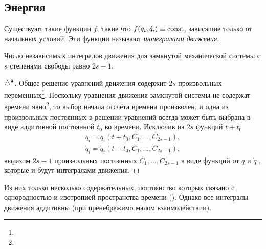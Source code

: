 \subsection{Энергия}

\begin{to_def} 
    Существуют такие функции $f$, такие что $f(q_i, \dot{q}_i) \equiv \text{const}$, зависящие только от начальных условий. Эти функции называют \textit{интегралами движения}.     
\end{to_def}

\begin{to_thr} 
    Число независимых интегралов движения для замкнутой механической системы с $s$ степенями свободы равно $2s-1$.      
\end{to_thr}

\begin{proof}[$\triangle^{\text{\xmark}}$]
    Общее решение уравнений движения содержит $2s$ произвольных переменных\footnote{
    }. Поскольку уравнения движения замкнутой системы не содержат времени явно\footnote{
    }, то выбор начала отсчёта времени произволен, и одна из произвольных постоянных в решении уравнений всегда может быть выбрана в виде аддитивной постоянной $t_0$ во времени. Исключив из $2s$ функций $t+t_0$
    \begin{align*}
        q_i = q_i \left( t+t_0, C_1, \ldots, C_{2s-1} \right), \\
        \dot{q}_i = \dot{q}_i \left( t+t_0, C_1, \ldots, C_{2s-1} \right),
    \end{align*}
    выразим $2s-1$ произвольных постоянных $C_1, \ldots, C_{2s-1}$ в виде функций от $q$ и $\dot{q}$ , которые и будут интегралами движения.
\end{proof}

Из них только несколько содержательных, постоянство которых связано с однородностью и изотропией пространства времени (). Однако все интегралы движения аддитивны (при пренебрежимо малом взаимодействии).

